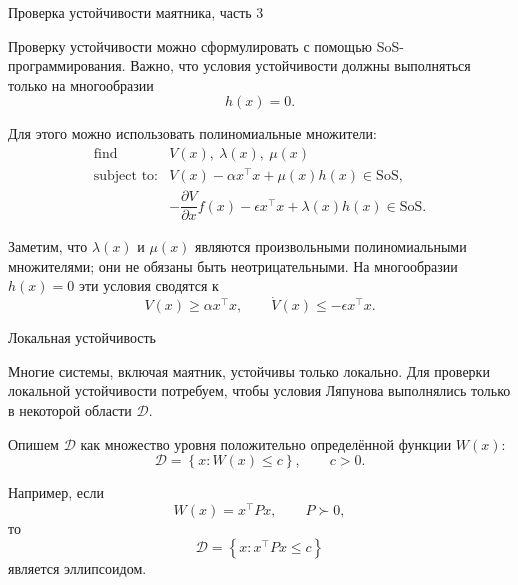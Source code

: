 \documentclass{beamer}
\begin{document}
\begin{frame}{Проверка устойчивости маятника, часть 3}
	\begin{flushleft}
		Проверку устойчивости можно сформулировать с помощью SoS-программирования. Важно, что условия устойчивости должны выполняться только на многообразии
		\[
		h(x)=0.
		\]
		
		
		Для этого можно использовать полиномиальные множители:
		\[
		\begin{array}{ll}
			\text{find} & V(x),\ \lambda(x),\ \mu(x)\\[0.2em]
			\text{subject to:}
			&
			V(x)-\alpha x^\top x+\mu(x)h(x)
			\in\mathrm{SoS},
			\\[0.4em]
			&
			-\dfrac{\partial V}{\partial x}f(x)
			-\epsilon x^\top x+\lambda(x)h(x)
			\in\mathrm{SoS}.
		\end{array}
		\]
		
		\bigskip
		
		Заметим, что $\lambda(x)$ и $\mu(x)$ являются произвольными полиномиальными множителями;
		они не обязаны быть неотрицательными. На многообразии $h(x)=0$ эти условия сводятся к
		\[
		V(x)\geq\alpha x^\top x,
		\qquad
		\dot V(x)\leq-\epsilon x^\top x.
		\]
		
		
	\end{flushleft}
\end{frame}


\begin{frame}{Локальная устойчивость}
	\begin{flushleft}
		Многие системы, включая маятник, устойчивы только локально. Для проверки локальной устойчивости потребуем, чтобы условия Ляпунова выполнялись только в некоторой области $\mathcal{D}$.
		
		\bigskip
		
		Опишем $\mathcal{D}$ как множество уровня положительно определённой функции $W(x)$:
		\[
		\mathcal{D}
		=
		\left\{
		x: W(x)\leq c
		\right\},
		\qquad c>0.
		\]
		
		\bigskip
		
		Например, если
		\[
		W(x)=x^\top Px,
		\qquad P\succ0,
		\]
		то
		\[
		\mathcal{D}
		=
		\left\{
		x:x^\top Px\leq c
		\right\}
		\]
		является эллипсоидом.
	\end{flushleft}
\end{frame}
\end{document}
